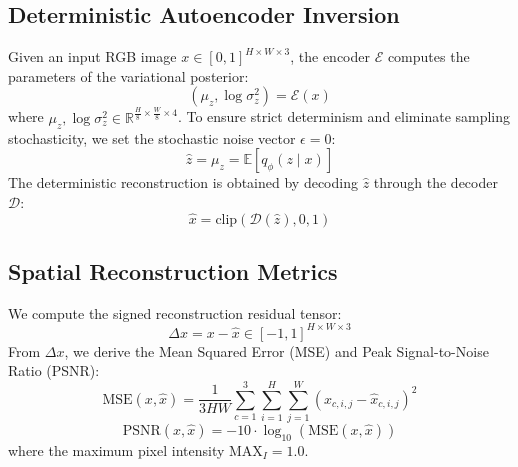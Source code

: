 \documentclass[11pt]{article}
\theoremstyle{definition}
\begin{document}
\subsection{Deterministic Autoencoder Inversion}
Given an input RGB image $x \in [0, 1]^{H \times W \times 3}$, the encoder $\mathcal{E}$ computes the parameters of the variational posterior:
\begin{equation}
(\mu_z, \log \sigma_z^2) = \mathcal{E}(x)
\end{equation}
where $\mu_z, \log \sigma_z^2 \in \mathbb{R}^{\frac{H}{8} \times \frac{W}{8} \times 4}$. To ensure strict determinism and eliminate sampling stochasticity, we set the stochastic noise vector $\epsilon = 0$:
\begin{equation}
\hat{z} = \mu_z = \mathbb{E}[q_\phi(z \mid x)]
\end{equation}
The deterministic reconstruction is obtained by decoding $\hat{z}$ through the decoder $\mathcal{D}$:
\begin{equation}
\hat{x} = \text{clip}\left(\mathcal{D}(\hat{z}), 0, 1\right)
\end{equation}

\subsection{Spatial Reconstruction Metrics}
We compute the signed reconstruction residual tensor:
\begin{equation}
\Delta x = x - \hat{x} \in [-1, 1]^{H \times W \times 3}
\end{equation}
From $\Delta x$, we derive the Mean Squared Error (MSE) and Peak Signal-to-Noise Ratio (PSNR):
\begin{equation}
\text{MSE}(x, \hat{x}) = \frac{1}{3 H W} \sum_{c=1}^3 \sum_{i=1}^H \sum_{j=1}^W \left( x_{c, i, j} - \hat{x}_{c, i, j} \right)^2
\end{equation}
\begin{equation}
\text{PSNR}(x, \hat{x}) = -10 \cdot \log_{10}\left(\text{MSE}(x, \hat{x})\right)
\end{equation}
where the maximum pixel intensity $\text{MAX}_I = 1.0$.
\end{document}
